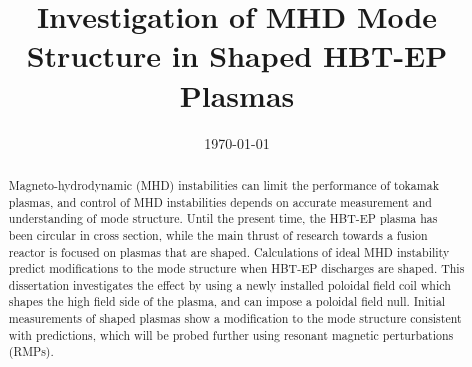 \documentclass[aps,preprint,showpacs,superscriptaddress,groupedaddress]{revtex4}  %
\begin{document}
\widetext
{}


\title{Investigation of MHD Mode Structure in Shaped HBT-EP Plasmas}

\date{\today}


\begin{abstract}
Magneto-hydrodynamic (MHD) instabilities can limit the performance of tokamak plasmas, and control of MHD instabilities depends on accurate measurement and understanding of mode structure.  Until the present time, the HBT-EP plasma has been circular in cross section, while the main thrust of research towards a fusion reactor is focused on plasmas that are shaped.  Calculations of ideal MHD instability predict modifications to the mode structure when HBT-EP discharges are shaped\cite{Maurer}.  This dissertation investigates the effect by using a newly installed poloidal field coil which shapes the high field side of the plasma, and can impose a poloidal field null.  Initial measurements of shaped plasmas show a modification to the mode structure consistent with predictions, which will be probed further using resonant magnetic perturbations (RMPs).
\end{abstract}

\maketitle
\end{document}
